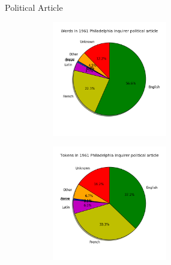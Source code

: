 \documentclass[10pt]{beamer}
\begin{document}
\begin{frame}[fragile]{Political Article}
  \pause

  \begin{figure}
  \centering
  \begin{subfigure}
  \centering
    \includegraphics[width=5cm]{politicswords.png}
  \end{subfigure}
  \begin{subfigure}
  \centering
    \includegraphics[width=5cm]{politicstokens.png}
  \end{subfigure}
  \end{figure}

\end{frame}
\end{document}
